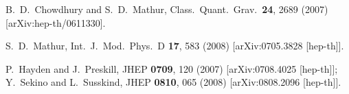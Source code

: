 \documentclass[12pt]{article}
\begin{document}
\begin{thebibliography}{99}
  B.~D.~Chowdhury and S.~D.~Mathur,
  Class.\ Quant.\ Grav.\  {\bf 24}, 2689 (2007)
  [arXiv:hep-th/0611330].

  S.~D.~Mathur,
  Int.\ J.\ Mod.\ Phys.\  D {\bf 17}, 583 (2008)
  [arXiv:0705.3828 [hep-th]].


  P.~Hayden and J.~Preskill,
  JHEP {\bf 0709}, 120 (2007)
  [arXiv:0708.4025 [hep-th]];
Y.~Sekino and L.~Susskind,
  JHEP {\bf 0810}, 065 (2008)
  [arXiv:0808.2096 [hep-th]].


  
\end{thebibliography}

 
\end{document}
